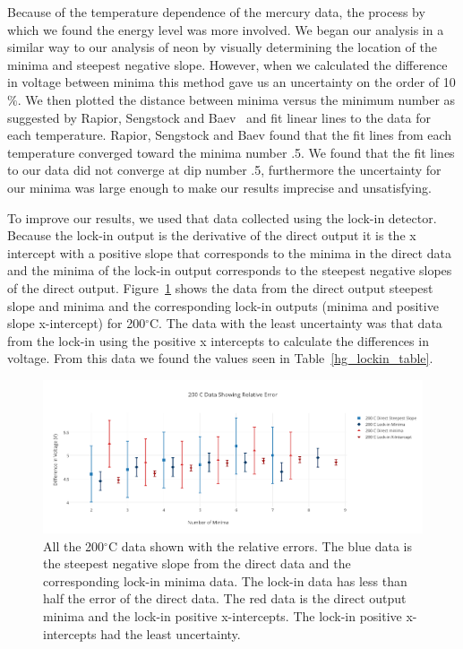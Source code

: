 \documentclass[prb,preprint]{revtex4-1}
\begin{document}
Because of the temperature dependence of the mercury data, the process by which we found the energy level was more involved. We began our analysis in a similar way to our analysis of neon by visually determining the location of the minima and steepest negative slope. However, when we calculated the difference in voltage between minima this method gave us an uncertainty on the order of 10$\%$. We then plotted the distance between minima versus the minimum number as suggested by Rapior, Sengstock and Baev~\cite{newfeatures} and fit linear lines to the data for each temperature. Rapior, Sengstock and Baev found that the fit lines from each temperature converged toward the minima number .5. We found that the fit lines to our data did not converge at dip number .5, furthermore the uncertainty for our minima was large enough to make our results imprecise and unsatisfying.

To improve our results, we used that data collected using the lock-in detector. Because the lock-in output is the derivative of the direct output it is the x intercept with a positive slope that corresponds to the minima in the direct data and the minima of the lock-in output corresponds to the steepest negative slopes of the direct output. Figure~\ref{rel_error} shows the data from the direct output steepest slope and minima and the corresponding lock-in outputs (minima and positive slope x-intercept) for 200$^{\circ}$C. The data with the least uncertainty was that data from the lock-in using the positive x intercepts to calculate the differences in voltage. From this data we found the values seen in Table~\ref{hg_lockin_table}.

\begin{figure}[h!]
\centering

\includegraphics[width=6in]{rel_error.pdf}
\caption{All the 200$^{\circ}$C data shown with the relative errors. The blue data is the steepest negative slope from the direct data and the corresponding lock-in minima data. The lock-in data has less than half the error of the direct data. The red data is the direct output minima and the lock-in positive x-intercepts. The lock-in positive x-intercepts had the least uncertainty.}

\label{rel_error}
\end{figure}
\end{document}
